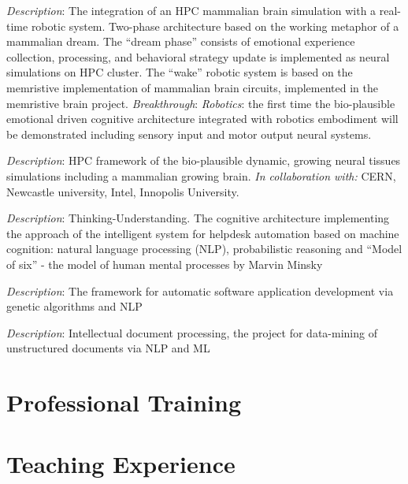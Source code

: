 \documentclass{moderncv}
\begin{document}
    {\small \emph{Description}: The integration of an HPC mammalian brain simulation with a real-time robotic system. Two-phase architecture based on the working metaphor of a mammalian dream. The ``dream phase'' consists of emotional experience collection, processing, and behavioral strategy update is implemented as neural simulations on HPC cluster. The ``wake'' robotic system is based on the memristive implementation of mammalian brain circuits, implemented in the memristive brain project.
    \emph{Breakthrough}: \emph{Robotics}: the first time the bio-plausible emotional driven cognitive architecture integrated with robotics embodiment will be demonstrated including sensory input and motor output neural systems.}

    {\small \emph{Description}: HPC framework of the bio-plausible dynamic, growing neural tissues simulations including a mammalian growing brain.
    \emph{In collaboration with:} CERN, Newcastle university, Intel, Innopolis University.}

    {\small \emph{Description}: Thinking-Understanding. The cognitive architecture implementing the approach of the intelligent system for helpdesk automation based on machine cognition: natural language processing (NLP), probabilistic reasoning and ``Model of six'' - the model of human mental processes by Marvin Minsky}

    {\small \emph{Description}: The framework for automatic software application development via genetic algorithms and NLP}

    {\small \emph{Description}: Intellectual document processing, the project for data-mining of unstructured documents via NLP and ML}

    \section{Professional Training}

    \section{Teaching Experience}
\end{document}
